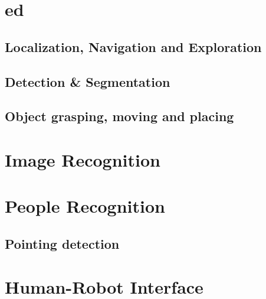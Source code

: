 \documentclass[runningheads,a4paper]{llncs}
\begin{document}
\section{\acrfull{ed}}


\subsection{Localization, Navigation and Exploration}


\subsection{Detection \& Segmentation}


\subsection{Object grasping, moving and placing}


\section{Image Recognition}


\section{People Recognition}

\subsection{Pointing detection}

%

%

%

\section{Human-Robot Interface}

\end{document}
